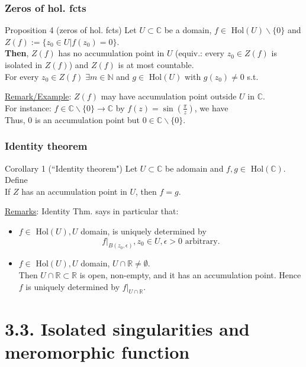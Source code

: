 \documentclass[10pt]{beamer}
\newcommand{\R}{\mathbb{R}}
\newcommand{\C}{\mathbb{C}}
\newcommand{\N}{\mathbb{N}}
\begin{document}
{\begin{frame}
\frametitle{Zeros of hol. fcts}
\begin{block}{Proposition 4 (zeros of hol. fcts)}
Let $U \subset \C$ be a domain,  $f\in$ Hol$(U)\backslash\{0\}$ and $Z(f):=\{z_0\in U | f(z_0)=0\}.$\\
\textbf{Then}, $Z(f)$ has no accumulation point in $U$ (equiv.: every $z_0\in Z(f)$ is isolated in $Z(f)$) and $Z(f)$ is at most countable.\\
\vspace{0.2cm}
For every $z_0\in Z(f)\; \exists m \in \N$ and $g\in$ Hol$(U)$ with $g(z_0)\neq 0$ s.t.\\
\vspace{2cm}
\end{block}
\vspace{0.2cm}
\underline{Remark/Example}: $Z(f)$ may have accumulation point outside $U$ in $\C$. \\
For instance: $f\in \C\backslash \{0\} \rightarrow \C$ by $f(z)=\sin(\frac{\pi}{z})$,  we have\\
\vspace{1cm}
Thus, $0$ is an accumulation point but $0\in \C\backslash \{0\}$.
\end{frame}

\begin{frame}
\frametitle{Identity theorem}
\begin{block}{Corollary 1 (``Identity theorem")}
Let $U \subset \C$ be adomain and $f,g \in$ Hol$(\C)$.
Define
$$\;$$
If $Z$ has an accumulation point in $U$, then $f=g$.
\end{block}
\vspace{0.2cm}
\underline{Remarks}: Identity Thm. says in particular that:
\begin{itemize}
\item $f\in$ Hol$(U), U$ domain, is uniquely determined by
$$f|_{B(z_0,\epsilon)}, z_0\in U, \epsilon>0 \text{ arbitrary.}$$
\item $f\in$ Hol$(U), U$ domain, $U \cap \R \neq \emptyset$.\\
Then $U \cap \R \subset \R$ is open, non-empty, and it has an accumulation point. Hence $f$ is uniquely determined by  $f|_{U \cap \R}$.
\end{itemize}
\end{frame}

\section{3.3.  Isolated singularities and meromorphic function}

}
\end{document}
